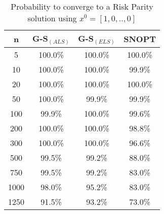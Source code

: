 \begin{table}
\centering
\begin{tabular}{ c | c | c | c}
n &  G-S$_{(ALS)}$ & G-S$_{(ELS)}$  & SNOPT \\\hline
5    & 100.0\%  & 100.0\% & 100.0\%\\\hline
10   & 100.0\%  & 100.0\% & 99.9\%\\\hline
20   & 100.0\%  & 100.0\%  & 100.0\%\\\hline
50   & 100.0\%  & 99.9\%  & 99.9\%\\\hline
100  & 99.9\%   & 100.0\%  & 99.6\% \\\hline
200  & 100.0\%  & 100.0\%  & 98.8\% \\\hline
300  & 100.0\%  & 100.0\%  & 96.6\% \\\hline
500  & 99.5\%   & 99.2\%   & 88.0\%\\\hline
750  & 99.5\%   & 99.2\%  & 83.0\%\\\hline
1000 & 98.0\%   & 95.2\%  & 83.0\%\\\hline
1250 & 91.5\%   & 93.2\%  & 73.0\%\\\hline
\end{tabular}
\caption{Probability to converge to a Risk Parity solution using $x^{0}= [1, 0, .., 0]$}
\label{tab:second}
\end{table}


